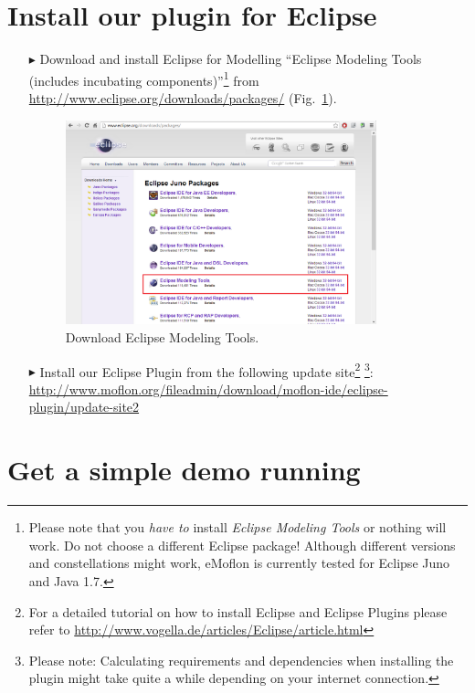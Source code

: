 \section{Install our plugin for Eclipse}
\begin{enumerate}
\item[$\blacktriangleright$] Download and install Eclipse for Modelling ``Eclipse Modeling Tools (includes incubating components)''\footnote{Please note that you \emph{have to} install \emph{Eclipse Modeling Tools} or nothing will work.  Do not choose a different Eclipse package!  Although different versions and constellations might work, eMoflon is currently tested for Eclipse Juno and Java 1.7.} from \url{http://www.eclipse.org/downloads/packages/} (Fig.~\ref{fig_downloadModelingPackage}).

\begin{figure}[htbp]
	\centering
  	\includegraphics[width=0.85\textwidth]{pics/installationAndSetup/eclipse_modelingpackage.png}
	\caption{Download Eclipse Modeling Tools.}
	\label{fig_downloadModelingPackage}
\end{figure}

\item[$\blacktriangleright$] Install our Eclipse Plugin from the following update site\footnote{For a detailed tutorial on how to install Eclipse and Eclipse Plugins please refer to \url{http://www.vogella.de/articles/Eclipse/article.html}} 
\footnote{Please note: Calculating requirements and dependencies when installing the plugin might take quite a while depending on your internet connection.}:
\url{http://www.moflon.org/fileadmin/download/moflon-ide/eclipse-plugin/update-site2}
\end{enumerate}

\section{Get a simple demo running}

